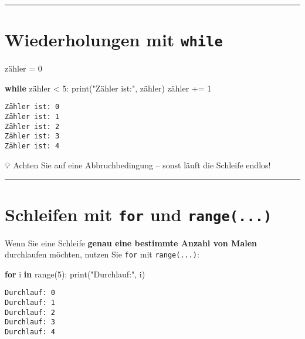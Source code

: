 \documentclass[
  letterpaper,
  DIV=11,
  numbers=noendperiod]{scrreprt}
\newenvironment{Shaded}{\begin{snugshade}}{\end{snugshade}}
\newcommand{\BuiltInTok}[1]{\textcolor[rgb]{0.00,0.23,0.31}{#1}}
\newcommand{\ControlFlowTok}[1]{\textcolor[rgb]{0.00,0.23,0.31}{\textbf{#1}}}
\newcommand{\DecValTok}[1]{\textcolor[rgb]{0.68,0.00,0.00}{#1}}
\newcommand{\KeywordTok}[1]{\textcolor[rgb]{0.00,0.23,0.31}{\textbf{#1}}}
\newcommand{\NormalTok}[1]{\textcolor[rgb]{0.00,0.23,0.31}{#1}}
\newcommand{\OperatorTok}[1]{\textcolor[rgb]{0.37,0.37,0.37}{#1}}
\newcommand{\StringTok}[1]{\textcolor[rgb]{0.13,0.47,0.30}{#1}}
\begin{document}
\begin{center}\rule{0.5\linewidth}{0.5pt}\end{center}

\section{\texorpdfstring{Wiederholungen mit
\texttt{while}}{Wiederholungen mit while}}\label{wiederholungen-mit-while}

\begin{Shaded}
\begin{Highlighting}[]
\NormalTok{zähler }\OperatorTok{=} \DecValTok{0}

\ControlFlowTok{while}\NormalTok{ zähler }\OperatorTok{\textless{}} \DecValTok{5}\NormalTok{:}
    \BuiltInTok{print}\NormalTok{(}\StringTok{"Zähler ist:"}\NormalTok{, zähler)}
\NormalTok{    zähler }\OperatorTok{+=} \DecValTok{1}
\end{Highlighting}
\end{Shaded}

\begin{verbatim}
Zähler ist: 0
Zähler ist: 1
Zähler ist: 2
Zähler ist: 3
Zähler ist: 4
\end{verbatim}

💡 Achten Sie auf eine Abbruchbedingung -- sonst läuft die Schleife
endlos!

\begin{center}\rule{0.5\linewidth}{0.5pt}\end{center}

\section{\texorpdfstring{Schleifen mit \texttt{for} und
\texttt{range(...)}}{Schleifen mit for und range(...)}}\label{schleifen-mit-for-und-range...}

Wenn Sie eine Schleife \textbf{genau eine bestimmte Anzahl von Malen}
durchlaufen möchten, nutzen Sie \texttt{for} mit \texttt{range(...)}:

\begin{Shaded}
\begin{Highlighting}[]
\ControlFlowTok{for}\NormalTok{ i }\KeywordTok{in} \BuiltInTok{range}\NormalTok{(}\DecValTok{5}\NormalTok{):}
    \BuiltInTok{print}\NormalTok{(}\StringTok{"Durchlauf:"}\NormalTok{, i)}
\end{Highlighting}
\end{Shaded}

\begin{verbatim}
Durchlauf: 0
Durchlauf: 1
Durchlauf: 2
Durchlauf: 3
Durchlauf: 4
\end{verbatim}
\end{document}
